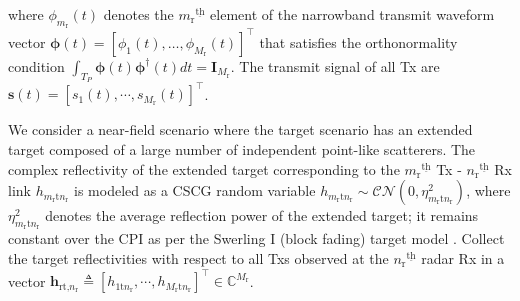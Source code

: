 \documentclass[10pt,journal]{IEEEtran}
\newcommand{\bracket}[1]{{\left [{#1}\right ]}}
\newcommand{\ith}[1]    {{#1}^{\underline{\text{th}}}}
\newcommand{\rr}{_\mathrm{r}}
\newcommand{\target}{\mathrm{t}}
\theoremstyle{definition}
\begin{document}
where $\phi_{m_\mathrm{r}}(t)$
denotes the $\ith{m_\mathrm{r}}$ element of the narrowband transmit waveform vector $\boldsymbol{\phi}(t)=\left[ \phi_1(t),\dots,\phi_{M_\mathrm{r}}(t)\right]^\top$ that satisfies the orthonormality condition $\int_{T_\mathit{P}}^{}\boldsymbol{\phi}(t)\boldsymbol{\phi}^\dagger(t)dt=\mathbf{I}_{M_\mathrm{r}}$.   The transmit signal of all Tx are $\mathbf{s}(t)=\bracket{s_1(t),\cdots,s_{M_\mathrm{r}}(t)}^\top$. 

We consider a near-field scenario where the target scenario has an extended target composed of a large number of independent point-like scatterers. %
The complex reflectivity of the extended target corresponding to the $\ith{m\rr}$ Tx - $\ith{n\rr}$ Rx link $h_{m\rr \target n\rr }$ is modeled as a CSCG random variable $h_{m\rr \target n\rr }\sim\mathcal{CN}(0,\eta^2_{m\rr\target n\rr})$, where $\eta^2_{m\rr\textrm{t}n\rr}$ denotes the average reflection power of the extended target; it remains constant over the CPI as per the Swerling I (block fading) target model \cite{fisher2006MIMO,haimovich2008mimo}. Collect the target reflectivities with respect to all Txs observed at the $\ith{n\rr}$ radar Rx in a vector $\mathbf{h}_{\textrm{rt,}n\rr}\triangleq\bracket{h_{1\textrm{t}n\rr},\cdots,h_{M\rr\textrm{t}n\rr}}^\top\in\mathbb{C}^{M\rr}$. 
\end{document}
